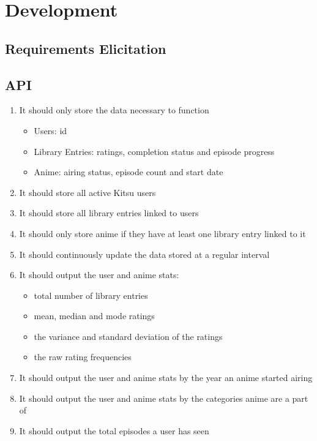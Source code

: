 \chapter{Development}


\section{Requirements Elicitation}

\section{API}

\begin{enumerate}
  \item It should only store the data necessary to function
    \begin{itemize}
      \item Users: id
      \item Library Entries: ratings, completion status and episode progress
      \item Anime: airing status, episode count and start date
    \end{itemize}
  \item It should store all active Kitsu users
  \item It should store all library entries linked to users
  \item It should only store anime if they have at least one library entry linked to it
  \item It should continuously update the data stored at a regular interval
  \item It should output the user and anime stats:
    \begin{itemize}
      \item total number of library entries
      \item mean, median and mode ratings
      \item the variance and standard deviation of the ratings
      \item the raw rating frequencies
    \end{itemize}
  \item It should output the user and anime stats by the year an anime started airing
  \item It should output the user and anime stats by the categories anime are a part of
  \item It should output the total episodes a user has seen
\end{enumerate}

